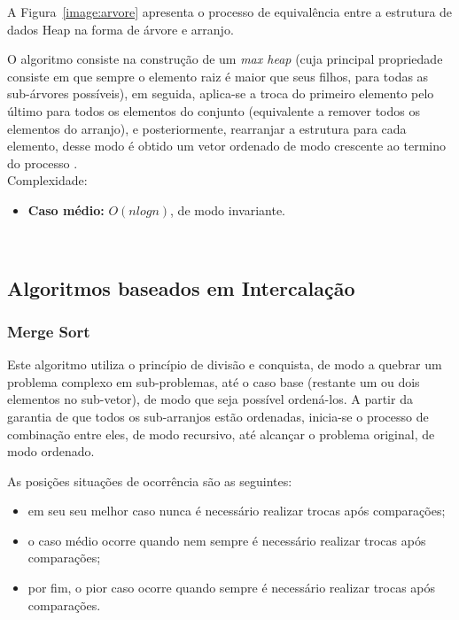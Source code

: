 \documentclass[conference,onecolumn]{IEEEtran}
\begin{document}
A Figura~\ref{image:arvore} apresenta o processo de equivalência entre a estrutura de dados Heap na forma de árvore e arranjo.

O algoritmo consiste na construção de um \textit{max heap} (cuja principal propriedade consiste em que sempre o elemento raiz é maior que seus filhos, para todas as sub-árvores possíveis), em seguida, aplica-se a troca do primeiro elemento pelo último para todos os elementos do conjunto (equivalente a remover todos os elementos do arranjo), e posteriormente, rearranjar a estrutura para cada elemento, desse modo é obtido um vetor ordenado de modo crescente ao termino do processo \cite{ziviani}.\\

Complexidade:
\begin{itemize}
\item \textbf{Caso médio:} $O (nlog n)$, de modo invariante.
\end{itemize}

~\\
\subsection{Algoritmos baseados em Intercalação}

\subsubsection{Merge Sort}

Este algoritmo utiliza o princípio de divisão e conquista, de modo a quebrar um problema complexo em sub-problemas, até o caso base (restante um ou dois elementos no sub-vetor), de modo que seja possível ordená-los. A partir da garantia de que todos os sub-arranjos estão ordenadas, inicia-se o processo de combinação entre eles, de modo recursivo, até alcançar o problema original, de modo ordenado.

As posições situações de ocorrência são as seguintes:
\begin{itemize}
\item em seu seu melhor caso nunca é necessário realizar trocas após comparações;
\item o caso médio ocorre quando nem sempre é necessário realizar trocas após comparações;
\item por fim, o pior caso ocorre quando sempre é necessário realizar trocas após comparações.
\end{itemize}~\\
\end{document}
